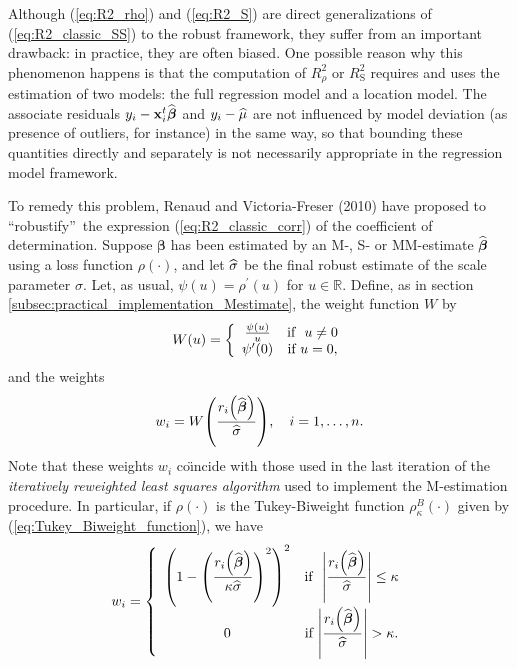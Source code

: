 Although (\ref{eq:R2_rho}) and (\ref{eq:R2_S}) are direct generalizations of
(\ref{eq:R2_classic_SS}) to the robust framework, they suffer from an
important drawback: in practice, they are often biased. One possible reason
why this phenomenon happens is that the computation of $R_{\rho}^{2}$ or
$R_{\mathrm{S}}^{2}$ requires and uses the estimation of two models: the full
regression model and a location model. The associate residuals $y_{i}%
-\stvec{x}_{i}^{t}\sthat{\boldsymbol\beta}$ and $y_{i}-\widehat{\mu}$ are
not influenced by model deviation (as presence of outliers, for instance) in
the same way, so that bounding these quantities directly and separately is not
necessarily appropriate in the regression model framework.

To remedy this problem, Renaud and Victoria-Freser (2010) have proposed to
\textquotedblleft robustify\textquotedblright\ the expression
(\ref{eq:R2_classic_corr}) of the coefficient of determination. Suppose
$\boldsymbol\beta$ has been estimated by an M-, S- or MM-estimate
$\widehat{\boldsymbol\beta}$ using a loss function $\rho\left(
\cdot\right)  $, and let $\widehat{\sigma}$ be the final robust estimate of
the scale parameter $\sigma$. Let, as usual, $\psi\left(  u\right)
=\rho^{\prime}\left(  u\right)  $ for $u\in\mathbb{R}$. Define, as in section
\ref{subsec:practical_implementation_Mestimate}, the weight function $W$ by
\[
W\left(  u\right)  =\left\{
\begin{array}
[c]{cc}%
\frac{\psi\left(  u\right)  }{u} & \text{if \ }u\neq0\\
\psi^{\prime}\left(  0\right)  & \text{if }u=0,
\end{array}
\right.
\]
and the weights
\[
w_{i}=W\left(  \frac{r_{i}\left(  \sthat{\boldsymbol\beta}\right)
}{\sthat{\sigma}}\right)  ,\quad i = 1, \dots, n.
\]
Note that these weights $w_{i}$ co\"{\i}ncide with those used in the last
iteration of the \emph{iteratively reweighted least squares algorithm} used
to implement the M-estimation procedure. In particular, if $\rho\left(
\cdot\right)  $ is the Tukey-Biweight function $\rho_{\kappa}^{B}\left(
\cdot\right)  $ given by (\ref{eq:Tukey_Biweight_function}), we have
\[
w_{i}=\left\{
\begin{array}
[c]{cc}%
\left(  1-\left(  \dfrac{r_{i}\left(  \sthat{\boldsymbol\beta}\right)
}{\kappa\sthat{\sigma}}\right)  ^{2}\right)  ^{2} & \text{if \ }\left\vert
\dfrac{r_{i}\left(  \sthat{\boldsymbol\beta}\right)  }{\sthat{\sigma}%
}\right\vert \leq\kappa\\
0 & \text{if }\left\vert \dfrac{r_{i}\left(  \sthat{\boldsymbol\beta%
}\right)  }{\sthat{\sigma}}\right\vert >\kappa.
\end{array}
\right.
\]
